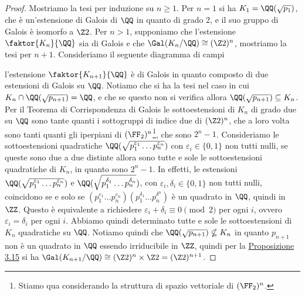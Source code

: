 \documentclass[11pt]{scrartcl}
\begin{document}
	\begin{proof}
		Mostriamo la tesi per induzione su $n \geq 1$. Per $n = 1$ si ha $K_1 = \QQ(\sqrt{p_1})$,
		che è un'estensione di Galois di $\QQ$ in quanto di grado 2, e il suo 
		gruppo di Galois è isomorfo a $\Z2$. Per $n > 1$, supponiamo che l'estensione
		$\faktor{K_n}{\QQ}$ sia di Galois e che $\Gal(K_n/\QQ) \cong (\Z2)^n$, 
		mostriamo la tesi per $n + 1$. Consideriamo il seguente diagramma di campi
		\begin{center}
		\end{center}
		l'estensione $\faktor{K_{n + 1}}{\QQ}$ è di Galois in quanto composto
		di due estensioni di Galois su $\QQ$. Notiamo che si ha la tesi nel caso 
		in cui $K_n \cap \QQ(\sqrt{p_{n + 1}}) = \QQ$, e che se questo non si 
		verifica allora $\QQ(\sqrt{p_{n + 1}}) \subseteq K_n$. Per il Teorema di 
		Corrispondenza di Galois le sottoestensioni di $K_n$ di grado due su 
		$\QQ$ sono tante quanti i sottogruppi di indice due di $(\Z2)^n$, che a 
		loro volta sono tanti quanti gli iperpiani di $(\FF_2)^n$\footnote{
			Stiamo qua considerando la struttura di spazio vettoriale di $(\FF_2)^n$.
		}, che sono $2^n - 1$.
		Consideriamo le sottoestensioni quadratiche 
		$\QQ(\sqrt{p_1^{\varepsilon_1}\ldots p_n^{\varepsilon_n}})$ con $\varepsilon_i \in \{0, 1\}$
		non tutti nulli, se queste sono due a due distinte allora sono tutte e sole
		le sottoestensioni quadratiche di $K_n$, in quanto sono $2^n - 1$. In effetti,
		le estensioni $\QQ(\sqrt{p_1^{\varepsilon_1}\ldots p_n^{\varepsilon_n}})$ e
		$\QQ(\sqrt{p_1^{\delta_1}\ldots p_n^{\delta_n}})$, con 
		$\varepsilon_i, \delta_i \in \{0, 1\}$ non tutti nulli, coincidono se e solo se 
		$(p_1^{\varepsilon_1}\ldots p_n^{\varepsilon_n})(p_1^{\delta_1}\ldots p_n^{\delta^n})$
		è un quadrato in $\QQ$, quindi in $\ZZ$. Questo è equivalente a richiedere
		$\varepsilon_i + \delta_i \equiv 0 \pmod 2$ per ogni $i$, ovvero 
		$\varepsilon_i = \delta_i$ per ogni $i$. Abbiamo quindi determinato tutte 
		e sole le sottoestensioni di $K_n$ quadratiche su $\QQ$. Notiamo quindi 
		che $\QQ(\sqrt{p_{n + 1}}) \nsubseteq K_n$ in quanto $p_{n + 1}$ non è 
		un quadrato in $\QQ$ essendo irriducibile in $\ZZ$, quindi per la 
		\hyperref[prop3.15]{Proposizione 3.15} si ha $\Gal(K_{n + 1}/\QQ) \cong
		(\Z2)^n\times \Z2 = (\Z2)^{n + 1}$.
	\end{proof}
	
\end{document}
